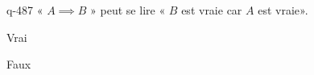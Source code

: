 \begin{truefalse}{q-487}
« $A \implies B$ » peut se lire « $B$ est vraie car $A$ est vraie».
\item Vrai
\item* Faux
\end{truefalse}


